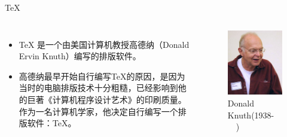 \documentclass[13pt]{ctexbeamer}
\begin{document}
\begin{frame}{TeX}


	\begin{columns}[c]  %

		\column{6cm}

		\begin{itemize}
			\item
			TeX
			是一个由美国计算机教授高德纳（Donald Ervin Knuth）编写的排版软件。

			\item 高德纳最早开始自行编写TeX的原因，是因为当时的电脑排版技术十分粗糙，已经影响到他的巨著《计算机程序设计艺术》的印刷质量。作为一名计算机学家，他决定自行编写一个排版软件：TeX。
		\end{itemize}


		\column{5cm}
		\begin{figure}[p]
			\includegraphics[scale=0.5]{Knuth.jpg}
			\caption{Donald Knuth(1938-~~)}
		\end{figure}

	\end{columns}


\end{frame}
\end{document}

